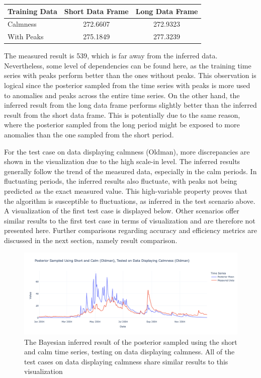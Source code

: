 \begin{center}
\begin{tabular}{@{}lcc@{}}
\toprule
\textbf{Training Data} & \textbf{Short Data Frame} & \textbf{Long Data Frame} \\ \midrule
Calmness           & 272.6607 & 272.9323                  \\
With Peaks             & 275.1849 & 277.3239              \\ \bottomrule
\end{tabular}
\end{center}
The measured result is 539, which is far away from the inferred data. Nevertheless, some level of dependencies can be found here, as the training time series with peaks perform better than the ones without peaks. This observation is logical since the posterior sampled from the time series with peaks is more used to anomalies and peaks across the entire time series. On the other hand, the inferred result from the long data frame performs slightly better than the inferred result from the short data frame. This is potentially due to the same reason, where the posterior sampled from the long period might be exposed to more anomalies than the one sampled from the short period. 

For the test case on data displaying calmness (Oldman), more discrepancies are shown in the visualization due to the high scale-in level. The inferred results generally follow the trend of the measured data, especially in the calm periods. In fluctuating periods, the inferred results also fluctuate, with peaks not being predicted as the exact measured value. This high-variable property proves that the algorithm is susceptible to fluctuations, as inferred in the test scenario above. A visualization of the first test case is displayed below. Other scenarios offer similar results to the first test case in terms of visualization and are therefore not presented here. Further comparisons regarding accuracy and efficiency metrics are discussed in the next section, namely result comparison.

\begin{figure}[H]
    \centering
    \includegraphics[width=.7\textwidth]{figures/time_series_analysis/ts_int/0_2.png}
    \captionsetup{width=.8\textwidth}
    \caption{The Bayesian inferred result of the posterior sampled using the short and calm time series, testing on data displaying calmness. All of the test cases on data displaying calmness share similar results to this visualization}
    \label{fig:enter-label}
\end{figure}


